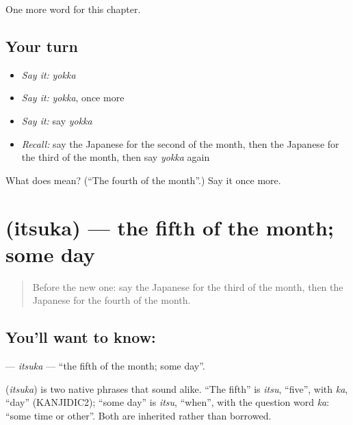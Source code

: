 \begin{grammarlens}[title={What you've built}]
One more word for this chapter.
\end{grammarlens}

\subsection*{Your turn}
\begin{itemize}
\raggedright
  \item \emph{Say it:} \emph{yokka}
  \item \emph{Say it:} \emph{yokka}, once more
  \item \emph{Say it:} say \emph{yokka}
  \item \emph{Recall:} say the Japanese for the second of the month, then the Japanese for the third of the month, then say \emph{yokka} again
\end{itemize}

\begin{tcolorbox}[breakable,colback=teal!4,colframe=teal!35!black,title={Before you move on}]
What does  mean? (\textquotedblleft{}The fourth of the month\textquotedblright{}.) Say it once more.
\end{tcolorbox}
\section[\texorpdfstring{\ja{いつか} (itsuka)}{いつか (itsuka)}]{ (itsuka) — the fifth of the month; some day}

\label{lesson:JA-C77-itsuka}



\begin{quote}
Before the new one: say the Japanese for the third of the month, then the Japanese for the fourth of the month.
\end{quote}

\subsection*{You'll want to know: }
\textbf{} — \emph{itsuka} — \textquotedblleft{}the fifth of the month; some day\textquotedblright{}.

\begin{cousinweb}
\textbf{} (\emph{itsuka}) is two native phrases that sound alike. \textquotedblleft{}The fifth\textquotedblright{} is \emph{itsu}, \textquotedblleft{}five\textquotedblright{}, with \emph{ka}, \textquotedblleft{}day\textquotedblright{} (KANJIDIC2); \textquotedblleft{}some day\textquotedblright{} is \emph{itsu}, \textquotedblleft{}when\textquotedblright{}, with the question word \emph{ka}: \textquotedblleft{}some time or other\textquotedblright{}. Both are inherited rather than borrowed.
\end{cousinweb}


